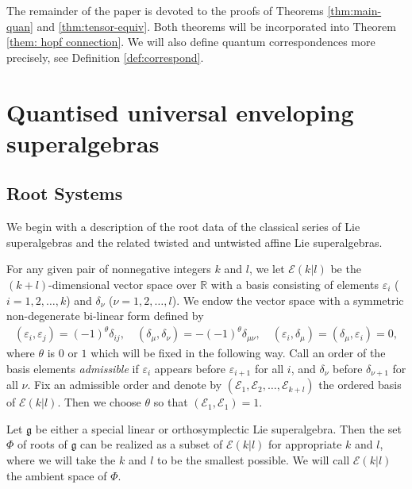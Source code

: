 \documentclass[12pt]{amsart}
\theoremstyle{definition}
\theoremstyle{remark}
\numberwithin{equation}{section}
\begin{document}
The remainder of the paper is devoted to the proofs of Theorems \ref{thm:main-quan} and \ref{thm:tensor-equiv}.  
Both theorems will be incorporated into Theorem \ref{them: hopf connection}. We will also define quantum correspondences more precisely, see Definition \ref{def:correspond}.

 \section{Quantised universal enveloping superalgebras}

\subsection{Root Systems}\label{sect:roots}

We begin with a description of the root data of the classical series of Lie superalgebras and the related twisted and untwisted affine Lie superalgebras.  

For any given pair of nonnegative integers $k$ and $l$, we let ${{\mathcal E}}(k|l)$ be the $(k+l)$-dimensional vector space over ${{\mathbb R}}$
with a basis consisting  of elements $\varepsilon_i$ ($i=1, 2, \dots, k$)
and $\delta_\nu$ ($\nu=1, 2, \dots, l$). We endow the vector space with a symmetric non-degenerate bi-linear form defined by
\begin{equation}\label{eq:bilinear form}
\begin{aligned}
(\varepsilon_i, \varepsilon_j)=(-1)^{\theta}\delta_{i j}, \quad (\delta_\mu, \delta_\nu)=-(-1)^{\theta}\delta_{\mu \nu}, \quad
(\varepsilon_i, \delta_\mu)=(\delta_\mu, \varepsilon_i)=0,
\end{aligned}
\end{equation}
where $\theta$ is $0$ or $1$ which will be fixed in the following way.
Call an order of the basis elements \emph{admissible} if $\varepsilon_i$ appears before
$\varepsilon_{i+1}$ for all $i$,  and $\delta_\nu$ before $\delta_{\nu+1}$
for all $\nu$. Fix an admissible order and denote by $({\mathcal E}_1, {\mathcal E}_2, \dots, {\mathcal E}_{k+l})$ the ordered basis of ${{\mathcal E}}(k|l)$. Then we choose $\theta$ so that
$
({\mathcal E}_1, {\mathcal E}_1)=1.
$

Let ${{\mathfrak g}}$ be either a special linear or orthosymplectic Lie superalgebra. Then the set $\Phi$ of roots of ${{\mathfrak g}}$ can be realized as a subset 
of ${{\mathcal E}}(k|l)$ for appropriate $k$ and $l$, where we will take the $k$ and $l$ to be the smallest possible.
We will call ${{\mathcal E}}(k|l)$ the ambient space of $\Phi$.
\end{document}
